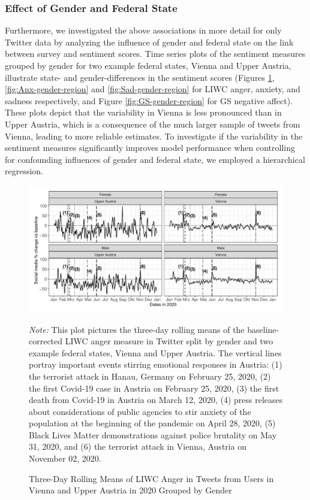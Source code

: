 \documentclass[
  english,
  jou,floatsintext]{apa7}
\begin{document}
\hypertarget{effect-of-gender-and-federal-state}{%
\subsubsection{Effect of Gender and Federal State}\label{effect-of-gender-and-federal-state}}

Furthermore, we investigated the above associations in more detail for only Twitter data by analyzing the influence of gender and federal state on the link between survey and sentiment scores.
Time series plots of the sentiment measures grouped by gender for two example federal states, Vienna and Upper Austria, illustrate state- and gender-differences in the sentiment scores (Figures \ref{fig:Ang-gender-region}, \ref{fig:Anx-gender-region} and \ref{fig:Sad-gender-region} for LIWC anger, anxiety, and sadness respectively, and Figure \ref{fig:GS-gender-region} for GS negative affect). These plots depict that the variability in Vienna is less pronounced than in Upper Austria, which is a consequence of the much larger sample of tweets from Vienna, leading to more reliable estimates. To investigate if the variability in the sentiment measures significantly improves model performance when controlling for confounding influences of gender and federal state, we employed a hierarchical regression.

\begin{figure}
\caption{Three-Day Rolling Means of LIWC Anger in Tweets from Users in Vienna and Upper Austria in 2020 Grouped by Gender}\label{fig:Ang-gender-region}
\includegraphics[width=\textwidth]{plots/plt_anger}

\textit{Note:} This plot pictures the three-day rolling means of the baseline-corrected LIWC anger measure in Twitter split by gender and two example federal states, Vienna and Upper Austria. The vertical lines portray important events stirring emotional responses in Austria: (1) the terrorist attack in Hanau, Germany on February 25, 2020, (2) the first Covid-19 case in Austria on February 25, 2020, (3) the first death from Covid-19 in Austria on March 12, 2020, (4) press releases about considerations of public agencies to stir anxiety of the population at the beginning of the pandemic on April 28, 2020, (5) Black Lives Matter demonstrations against police brutality on May 31, 2020, and (6) the terrorist attack in Vienna, Austria on November 02, 2020.
\end{figure}
\end{document}
